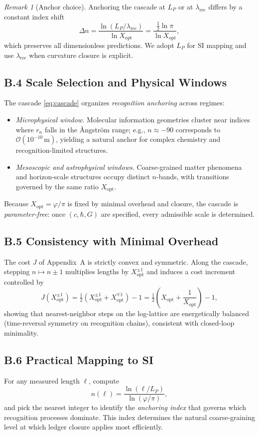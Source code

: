 \documentclass[11pt]{article}
\theoremstyle{definition}
\theoremstyle{remark}
\newtheorem{remark}[theorem]{Remark}
\begin{document}
\begin{remark}[Anchor choice]
Anchoring the cascade at $L_P$ or at $\lambda_{\mathrm{rec}}$ differs by a constant index shift
\[
\Delta n=\frac{\ln(L_P/\lambda_{\mathrm{rec}})}{\ln X_{\mathrm{opt}}}=\frac{\tfrac12\ln\pi}{\ln X_{\mathrm{opt}}},
\]
which preserves all dimensionless predictions. We adopt $L_P$ for SI mapping and use $\lambda_{\mathrm{rec}}$ when curvature closure is explicit.
\end{remark}

\subsection*{B.4 Scale Selection and Physical Windows}
The cascade \eqref{eq:cascade} organizes \emph{recognition anchoring} across regimes:
\begin{itemize}
\item \textit{Microphysical window.} Molecular information geometries cluster near indices where $r_n$ falls in the \AA ngström range; e.g., $n\approx -90$ corresponds to $\mathcal{O}(10^{-10}\,\mathrm{m})$, yielding a natural anchor for complex chemistry and recognition-limited structures.
\item \textit{Mesoscopic and astrophysical windows.} Coarse-grained matter phenomena and horizon-scale structures occupy distinct $n$-bands, with transitions governed by the same ratio $X_{\mathrm{opt}}$.
\end{itemize}
Because $X_{\mathrm{opt}}=\varphi/\pi$ is fixed by minimal overhead and closure, the cascade is \emph{parameter-free}: once $(c,\hbar,G)$ are specified, every admissible scale is determined.

\subsection*{B.5 Consistency with Minimal Overhead}
The cost $J$ of Appendix~A is strictly convex and symmetric. Along the cascade, stepping $n\mapsto n\pm1$ multiplies lengths by $X_{\mathrm{opt}}^{\pm1}$ and induces a cost increment controlled by
\[
J\!\left(X_{\mathrm{opt}}^{\pm1}\right)=\tfrac12\!\left(X_{\mathrm{opt}}^{\pm1}+X_{\mathrm{opt}}^{\mp1}\right)-1
=\tfrac12\!\left(X_{\mathrm{opt}}+\frac{1}{X_{\mathrm{opt}}}\right)-1,
\]
showing that nearest-neighbor steps on the log-lattice are energetically balanced (time-reversal symmetry on recognition chains), consistent with closed-loop minimality.

\subsection*{B.6 Practical Mapping to SI}
For any measured length $\ell$, compute
\[
n(\ell)=\frac{\ln(\ell/L_P)}{\ln(\varphi/\pi)},
\]
and pick the nearest integer to identify the \emph{anchoring index} that governs which recognition processes dominate. This index determines the natural coarse-graining level at which ledger closure applies most efficiently.
\end{document}

